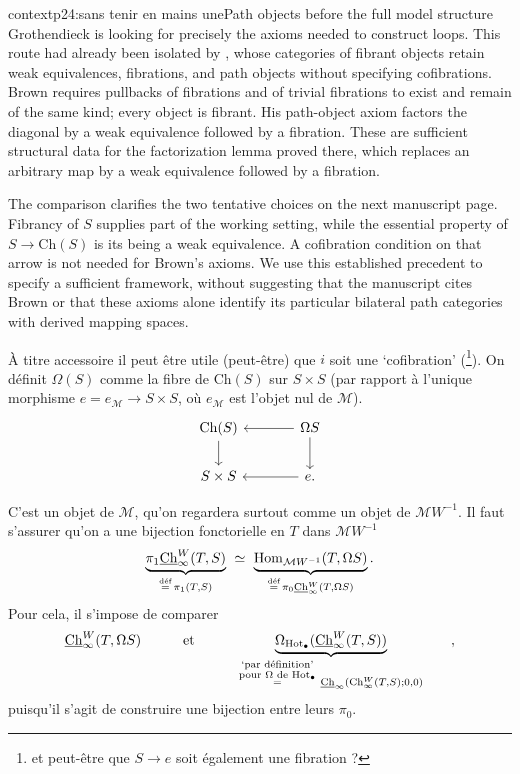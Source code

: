 \begin{dcomment}{context}{p24:sans tenir en mains une}{Path objects before the full model structure}
Grothendieck is looking for precisely the axioms needed to construct loops. This route had already been isolated by \citet[\S1, pp.~420--421]{Brown1973}, whose categories of fibrant objects retain weak equivalences, fibrations, and path objects without specifying cofibrations. Brown requires pullbacks of fibrations and of trivial fibrations to exist and remain of the same kind; every object is fibrant. His path-object axiom factors the diagonal by a weak equivalence followed by a fibration. These are sufficient structural data for the factorization lemma proved there, which replaces an arbitrary map by a weak equivalence followed by a fibration.

The comparison clarifies the two tentative choices on the next manuscript page. Fibrancy of $S$ supplies part of the working setting, while the essential property of $S\to\mathrm{Ch}(S)$ is its being a weak equivalence. A cofibration condition on that arrow is not needed for Brown's axioms. We use this established precedent to specify a sufficient framework, without suggesting that the manuscript cites Brown or that these axioms alone identify its particular bilateral path categories with derived mapping spaces.
\end{dcomment}



À titre accessoire il peut être utile (peut-être) que $i$ soit une `cofibration' (\footnote[9]{et peut-être que $S \longrightarrow e$ soit également une fibration ?}). On définit $\Omega(S)$ comme la fibre de $\mathrm{Ch}(S)$ sur $S{\times}S$ (par rapport à l'unique morphisme $e = e_{\mathcal{M}} \longrightarrow S\times S$, où $e_{\mathcal{M}}$ est l'objet nul de $\mathcal{M}$).
\[
\begin{tikzcd}[column sep=large]
\mathrm{Ch}(S) \arrow[d] & \Omega S \arrow[l] \arrow[d]\\
S \times S & e. \arrow[l]
\end{tikzcd}
\]

\newpage


C'est un objet de $\mathcal{M}$, qu'on regardera surtout comme un objet de $\mathcal{M}W^{-1}$. Il faut s'assurer qu'on a une bijection fonctorielle en $T$ dans $\mathcal{M}W^{-1}$
\[
\underbrace{\pi_1\Chu^W_\infty(T, S)}_{\overset{\text{déf}}{=}\,\pi_1(T,S)} \ \simeq\ \underbrace{\mathrm{Hom}_{\mathcal{M}W^{-1}}(T, \Omega S)}_{\overset{\text{déf}}{=}\,\pi_0\Chu^W_\infty(T,\Omega S)}.
\]
Pour cela, il s'impose de comparer
\[
\Chu^W_\infty(T, \Omega S) \qquad\quad \text{et} \qquad\quad \underbrace{\Omega_{\Hot_\bullet}(\Chu^W_\infty(T, S))}_{\overset{\substack{\text{`par définition'}\\ \text{pour $\Omega$ de $\mathrm{Hot}_\bullet$}}}{=}\ \Chu_\infty(\mathrm{Ch}^W_\infty(T,S);0,0)} \qquad ,
\]
puisqu'il s'agit de construire une bijection entre leurs $\pi_0$.

